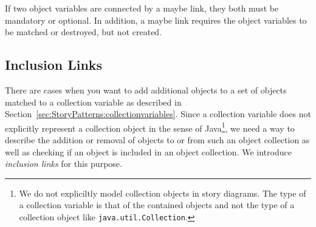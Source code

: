 If two object variables are connected by a maybe link, they both must be mandatory or optional. In addition, a maybe link requires the object variables to be matched or destroyed, but not created.  



\subsection{Inclusion Links}
\label{sec:StoryPatterns:inclusion}

There are cases when you want to add additional objects to a set of objects matched to a collection variable as described in Section~\ref{sec:StoryPatterns:collectionvariables}.
Since a collection variable does not explicitly represent a collection object in the sense of Java\footnote{
We do not expliciltly model collection objects in story diagrams.
The type of a collection variable is that of the contained objects and not the
type of a collection object like \texttt{java.util.Collection}. }, we need a way to describe the addition or removal of
objects to or from such an object collection as well as checking if an object is included in an object collection. We introduce \emph{inclusion links} for this purpose.

